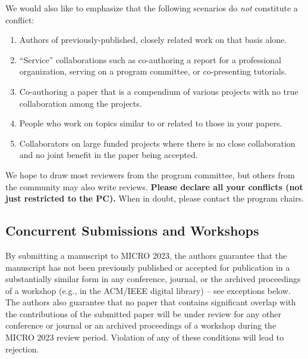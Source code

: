 \documentclass{sig-alternate}
\begin{document}
We would also like to emphasize that the following scenarios do {\em not} constitute a conflict:
\begin{enumerate}
\item Authors of previously-published, closely related work on that basis alone.
\item ``Service'' collaborations such as co-authoring a report for a professional organization, serving on a program committee, or co-presenting tutorials.
\item Co-authoring a paper that is a compendium of various projects with no true collaboration among the projects.
\item People who work on topics similar to or related to those in your papers.
\item Collaborators on large funded projects where there is no close collaboration and no joint benefit in the paper being accepted.
\end{enumerate}

We hope to draw most reviewers from the program committee, but others
from the community may also write reviews. {\bf Please declare all your conflicts (not just restricted to the PC).} When in doubt, please contact the program chairs.



\subsection{Concurrent Submissions and Workshops}

By submitting a manuscript to MICRO 2023, the authors guarantee that the manuscript has not been previously published or accepted for publication in a substantially similar form in any conference, journal, or the archived proceedings of a workshop (e.g., in the ACM/IEEE digital library) -- see exceptions below. The authors also guarantee that no paper that contains significant overlap with the contributions of the submitted paper will be under review for any other conference or journal or an archived proceedings of a workshop during the MICRO 2023 review period. Violation of any of these conditions will lead to rejection.
\end{document}
